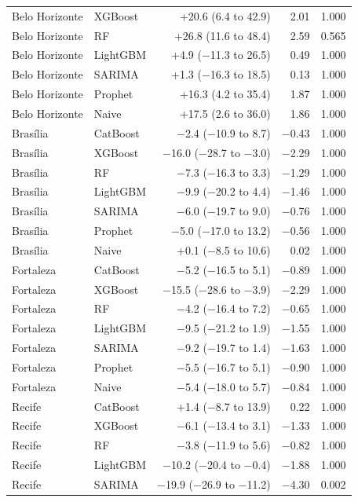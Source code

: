 \begin{longtable}{llrrr}
Belo Horizonte & XGBoost & +20.6 (6.4 to 42.9) & 2.01 & 1.000 \\
Belo Horizonte & RF & +26.8 (11.6 to 48.4) & 2.59 & 0.565 \\
Belo Horizonte & LightGBM & +4.9 ($-$11.3 to 26.5) & 0.49 & 1.000 \\
Belo Horizonte & SARIMA & +1.3 ($-$16.3 to 18.5) & 0.13 & 1.000 \\
Belo Horizonte & Prophet & +16.3 (4.2 to 35.4) & 1.87 & 1.000 \\
Belo Horizonte & Naive & +17.5 (2.6 to 36.0) & 1.86 & 1.000 \\
Bras\'ilia & CatBoost & $-$2.4 ($-$10.9 to 8.7) & $-$0.43 & 1.000 \\
Bras\'ilia & XGBoost & $-$16.0 ($-$28.7 to $-$3.0) & $-$2.29 & 1.000 \\
Bras\'ilia & RF & $-$7.3 ($-$16.3 to 3.3) & $-$1.29 & 1.000 \\
Bras\'ilia & LightGBM & $-$9.9 ($-$20.2 to 4.4) & $-$1.46 & 1.000 \\
Bras\'ilia & SARIMA & $-$6.0 ($-$19.7 to 9.0) & $-$0.76 & 1.000 \\
Bras\'ilia & Prophet & $-$5.0 ($-$17.0 to 13.2) & $-$0.56 & 1.000 \\
Bras\'ilia & Naive & +0.1 ($-$8.5 to 10.6) & 0.02 & 1.000 \\
Fortaleza & CatBoost & $-$5.2 ($-$16.5 to 5.1) & $-$0.89 & 1.000 \\
Fortaleza & XGBoost & $-$15.5 ($-$28.6 to $-$3.9) & $-$2.29 & 1.000 \\
Fortaleza & RF & $-$4.2 ($-$16.4 to 7.2) & $-$0.65 & 1.000 \\
Fortaleza & LightGBM & $-$9.5 ($-$21.2 to 1.9) & $-$1.55 & 1.000 \\
Fortaleza & SARIMA & $-$9.2 ($-$19.7 to 1.4) & $-$1.63 & 1.000 \\
Fortaleza & Prophet & $-$5.5 ($-$16.7 to 5.1) & $-$0.90 & 1.000 \\
Fortaleza & Naive & $-$5.4 ($-$18.0 to 5.7) & $-$0.84 & 1.000 \\
Recife & CatBoost & +1.4 ($-$8.7 to 13.9) & 0.22 & 1.000 \\
Recife & XGBoost & $-$6.1 ($-$13.4 to 3.1) & $-$1.33 & 1.000 \\
Recife & RF & $-$3.8 ($-$11.9 to 5.6) & $-$0.82 & 1.000 \\
Recife & LightGBM & $-$10.2 ($-$20.4 to $-$0.4) & $-$1.88 & 1.000 \\
Recife & SARIMA & $-$19.9 ($-$26.9 to $-$11.2) & $-$4.30 & 0.002 \\

\end{longtable}

